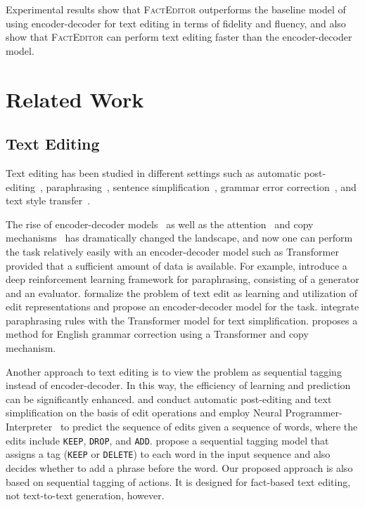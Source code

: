 \documentclass[11pt,a4paper]{article}
\begin{document}
Experimental results show that \textsc{FactEditor} outperforms the baseline model of using encoder-decoder for text editing in terms of fidelity and fluency, and also show that \textsc{FactEditor} can perform text editing faster than the encoder-decoder model.

\section{Related Work}
\subsection{Text Editing}
Text editing has been studied in different settings such as automatic post-editing~\cite{knight1994automated,simard2007statistical,yang2017identifying}, paraphrasing~\cite{dolan-brockett-2005-automatically}, sentence simplification~\cite{inui-etal-2003-text, wubben-etal-2012-sentence}, grammar error correction~\cite{ng2014conll}, and text style transfer~\cite{shen2017style,hu2017toward}. 

The rise of encoder-decoder models~\cite{cho2014learning,sutskever2014sequence} as well as the attention~\cite{bahdanau2015neural,vaswani2017attention} and copy mechanisms~\cite{gu-etal-2016-incorporating,gulcehre-etal-2016-pointing} has dramatically changed the landscape, and now one can perform the task relatively easily with an encoder-decoder model such as Transformer provided that a sufficient amount of data is available. For example, \citet{li2018paraphrase} introduce a deep reinforcement learning framework for paraphrasing, consisting of a generator and an evaluator. \citet{yin2019learning} formalize the problem of text edit as learning and utilization of edit representations and propose an encoder-decoder model for the task. \citet{zhao2018integrating} integrate paraphrasing rules with the Transformer model for text simplification. \citet{zhao2019improving} proposes a method for English grammar correction using a Transformer and copy mechanism. 

Another approach to text editing is to view the problem as sequential tagging instead of encoder-decoder. In this way, the efficiency of learning and prediction can be significantly enhanced. \citet{vu2018automatic} and \citet{dong2019editnts} conduct automatic post-editing and text simplification on the basis of edit operations and employ Neural Programmer-Interpreter~\cite{reed2016neural} to predict the sequence of edits given a sequence of words, where the edits include \texttt{KEEP}, \texttt{DROP}, and \texttt{ADD}. \citet{malmi2019lasertagger} propose a sequential tagging model that assigns a tag (\texttt{KEEP} or \texttt{DELETE}) to each word in the input sequence and also decides whether to add a phrase before the word. Our proposed approach is also based on sequential tagging of actions. It is designed for fact-based text editing, not text-to-text generation, however.
\end{document}
